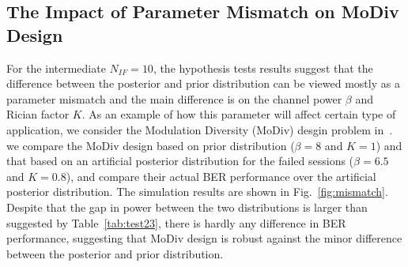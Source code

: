 \documentclass[journal,draftcls,onecolumn,12pt,twoside]{IEEEtran}
\begin{document}
\subsection{The Impact of Parameter Mismatch on MoDiv Design}
For the intermediate $N_{IF} = 10$, the hypothesis tests results suggest that
the difference between the posterior and prior distribution can be viewed
mostly as a parameter mismatch and the main difference is on the channel power
$\beta$ and Rician factor $K$. As an example of how this parameter will affect
certain type of application, we consider the Modulation Diversity (MoDiv) desgin
problem in~\cite{wu2015modulation}\cite{harvind2005symbol}. we compare the
MoDiv design based on prior distribution ($\beta = 8$ and $K = 1$) and that
based on an artificial posterior distribution for the failed sessions ($\beta =
6.5$ and $K = 0.8$), and compare their actual BER performance over the
artificial posterior distribution.
The simulation results are shown in Fig.~\ref{fig:mismatch}.
Despite that the gap in power between the two distributions is larger than
suggested by Table~\ref{tab:test23}, there is hardly any difference in BER
performance, suggesting that MoDiv design is robust against the minor
difference between the posterior and prior distribution.
\end{document}
